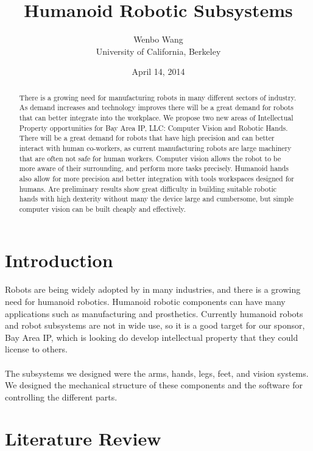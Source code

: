 \documentclass[letterpaper]{article}
\title{Humanoid Robotic Subsystems}
\date{April 14, 2014}
\author{Wenbo Wang \\University of California, Berkeley}
\begin{document}
\maketitle

\begin{abstract}
There is a growing need for manufacturing robots in many different sectors of
industry. As demand increases and technology improves there will be a great
demand for robots that can better integrate into the workplace. We propose two
new areas of Intellectual Property opportunities for Bay Area IP, LLC: Computer
Vision and Robotic Hands. There will be a great demand for robots that have high
precision and can better interact with human co-workers, as current
manufacturing robots are large machinery that are often not safe for human
workers. Computer vision allows the robot to be more aware of their surrounding,
and perform more tasks precisely. Humanoid hands also allow for more precision
and better integration with tools workspaces designed for humans. Are
preliminary results show great difficulty in building suitable robotic hands
with high dexterity without many the device large and cumbersome, but simple
computer vision can be built cheaply and effectively.  
\end{abstract}

\section{Introduction}
\paragraph{}Robots are being widely adopted by in many industries, and there is
a growing need for humanoid robotics. Humanoid robotic components can have many
applications such as manufacturing and prosthetics. Currently humanoid robots
and robot subsystems are not in wide use, so it is a good target for our
sponsor, Bay Area IP, which is looking do develop intellectual property that
they could license to others.

\paragraph{}The subsystems we designed were the arms, hands, legs, feet, and
vision systems.  We designed the mechanical structure of these components and
the software for controlling the different parts. 

\section{Literature Review}
\end{document}
